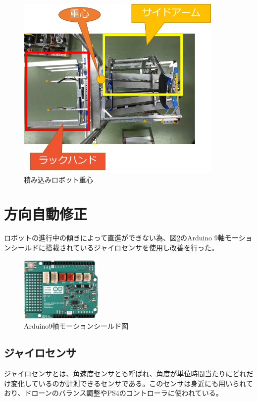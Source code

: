 \documentclass[12pt,oneside]{sotsuken_paper}
\begin{document}
		\begin{figure}[htp]
			\begin{center}
				\includegraphics[width=100mm]{Image/積込ロボット重心.png}
				\caption{積み込みロボット重心}
				\label{積込ロボット重心}
			\end{center}
		\end{figure} 

	\section{方向自動修正}
	ロボットの進行中の傾きによって直進ができない為、図\ref{Arduino9軸モーションシールド図}のArduino 9軸モーションシールドに搭載されているジャイロセンサを使用し改善を行った。

\begin{figure}[htp]
		\begin{center}
			\includegraphics[width=40mm]{Image/Arduino9軸モーションシールド図.png}
			\caption{Arduino9軸モーションシールド図}
			\label{Arduino9軸モーションシールド図}
		\end{center}
\end{figure}

		\subsection{ジャイロセンサ}
		ジャイロセンサとは、角速度センサとも呼ばれ、角度が単位時間当たりにどれだけ変化しているのか計測できるセンサである。このセンサは身近にも用いられており、ドローンのバランス調整やPS4のコントローラに使われている。
\end{document}
